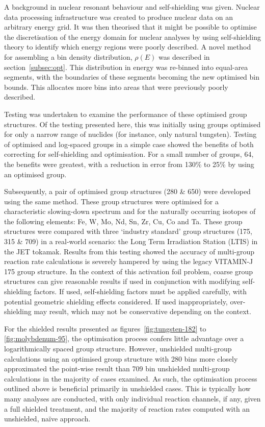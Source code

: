A background in nuclear resonant behaviour and self-shielding was given. Nuclear data processing infrastructure was created to produce nuclear data on an arbitrary energy grid. It was then theorised that it might be possible to optimise the discretisation of the energy domain for nuclear analyses by using self-shielding theory to identify which energy regions were poorly described. A novel method for assembling a bin density distribution, $\rho(E)$ was described in section~\ref{subsec:opt}. This distribution in energy was re-binned into equal-area segments, with the boundaries of these segments becoming the new optimised bin bounds. This allocates more bins into areas that were previously poorly described.

Testing was undertaken to examine the performance of these optimised group structures. Of the testing presented here, this was initially using groups optimised for only a narrow range of nuclides (for instance, only natural tungsten). Testing of optimised and log-spaced groups in a simple case showed the benefits of both correcting for self-shielding and optimisation. For a small number of groups, 64, the benefits were greatest, with a reduction in error from 130\% to 25\% by using an optimised group.

Subsequently, a pair of optimised group structures (280 \& 650) were developed using the same method. These group structures were optimised for a characteristic slowing-down spectrum and for the naturally occurring isotopes of the following elements: Fe, W, Mo, Nd, Sn, Zr, Cu, Co and Ta. These group structures were compared with three `industry standard' group structures (175, 315 \& 709) in a real-world scenario: the Long Term Irradiation Station (LTIS) in the JET tokamak. Results from this testing showed the accuracy of multi-group reaction rate calculations is severely hampered by using the legacy VITAMIN-J 175 group structure. In the context of this activation foil problem, coarse group structures can give reasonable results if used in conjunction with modifying self-shielding factors. If used, self-shielding factors must be applied carefully, with potential geometric shielding effects considered. If used inappropriately, over-shielding may result, which may not be conservative depending on the context. 

For the shielded results presented as figures~\ref{fig:tungsten-182} to \ref{fig:molybdenum-95}, the optimisation process confers little advantage over a logarithmically spaced group structure. However, unshielded multi-group calculations using an optimised group structure with 280 bins more closely approximated the point-wise result than 709 bin unshielded multi-group calculations in the majority of cases examined. As such, the optimisation process outlined above is beneficial primarily in unshielded cases. This is typically how many analyses are conducted, with only individual reaction channels, if any, given a full shielded treatment, and the majority of reaction rates computed with an unshielded, na\"{i}ve approach.

